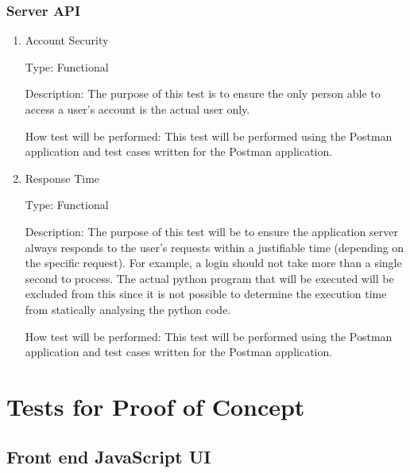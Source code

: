 \documentclass[12pt, titlepage]{article}
\begin{document}
\subsubsection{Server API}

\begin{enumerate}

\item{Account Security\\}

Type: Functional

Description: The purpose of this test is to ensure the only person able to
access a user's account is the actual user only.

How test will be performed: This test will be performed using the Postman
application and test cases written for the Postman application.
					
\item{Response Time\\}

Type: Functional

Description: The purpose of this test will be to ensure the application server
always responds to the user's requests within a justifiable time (depending on
the specific request).  For example, a login should not take more than a single
second to process. The actual python program that will be executed will be
excluded from this since it is not possible to determine the execution time
from statically analysing the python code.

How test will be performed: This test will be performed using the Postman
application and test cases written for the Postman application.

\end{enumerate}

\section{Tests for Proof of Concept}

\subsection{Front end JavaScript UI}
		
\end{document}
